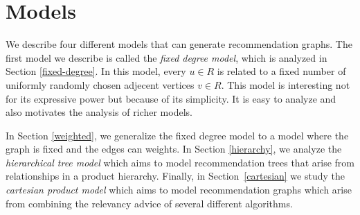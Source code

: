 \section{Models}
We describe four different models that can generate recommendation
graphs. The first model we describe is called the {\em fixed degree
model}, which is analyzed in Section \ref{fixed-degree}. In this
model, every $u\in R$ is related to a fixed number of uniformly
randomly chosen adjecent vertices $v\in R$. This model is interesting
not for its expressive power but because of its simplicity.  It is
easy to analyze and also motivates the analysis of richer models.

In Section \ref{weighted}, we generalize the fixed degree model to a
model where the graph is fixed and the edges can weights. In Section
\ref{hierarchy}, we analyze the {\em hierarchical tree model} which
aims to model recommendation trees that arise from relationships in a
product hierarchy. Finally, in Section~\ref{cartesian} we study the 
{\em cartesian product model} which aims to model recommendation 
graphs which arise from combining the relevancy advice of several 
different algorithms.